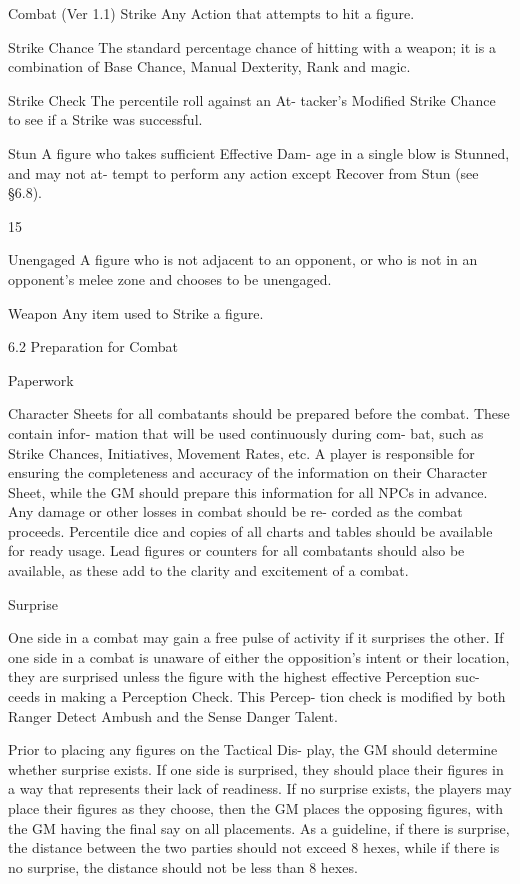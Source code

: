 \begin{Chapter}{Combat (Ver 1.1)}
Strike Any Action that attempts to hit a figure. 

Strike Chance The standard percentage chance of 
hitting with a weapon; it is a combination of Base 
Chance, Manual Dexterity, Rank and magic. 

Strike  Check  The  percentile  roll  against  an  At-
tacker’s  Modified  Strike  Chance  to  see  if  a  Strike 
was successful. 

Stun A figure who takes sufficient Effective Dam-
age  in  a  single  blow  is  Stunned,  and  may  not  at-
tempt  to  perform  any  action  except  Recover  from 
Stun (see §6.8). 

15 

Unengaged  A  figure  who  is  not  adjacent  to  an 
opponent,  or  who  is  not  in  an  opponent’s  melee 
zone and chooses to be unengaged. 

Weapon Any item used to Strike a figure. 

6.2 Preparation for Combat 

Paperwork 

Character  Sheets  for  all  combatants  should  be 
prepared  before  the  combat.  These  contain  infor-
mation that will be used continuously during com-
bat, such as Strike Chances, Initiatives, Movement 
Rates, etc. A player is responsible for ensuring the 
completeness  and  accuracy  of  the  information  on 
their Character Sheet, while the GM should prepare 
this  information  for  all  NPCs  in  advance.  Any 
damage  or  other  losses  in  combat  should  be  re-
corded as the combat proceeds. Percentile dice and 
copies  of  all  charts  and  tables  should  be  available 
for  ready  usage.  Lead  figures  or  counters  for  all 
combatants  should  also  be  available,  as  these  add 
to the clarity and excitement of a combat. 

Surprise 

One  side  in  a  combat  may  gain  a  free  pulse  of 
activity  if  it  surprises  the  other.  If  one  side  in  a 
combat is unaware of either the opposition’s intent 
or  their  location,  they  are  surprised  unless  the 
figure  with  the  highest  effective  Perception  suc-
ceeds in making a Perception Check. This Percep-
tion  check  is  modified  by  both  Ranger  Detect 
Ambush and the Sense Danger Talent. 

Prior  to  placing  any  figures  on  the  Tactical  Dis-
play,  the  GM  should  determine  whether  surprise 
exists.  If  one  side  is  surprised,  they  should  place 
their  figures  in  a  way  that  represents  their  lack  of 
readiness.  If  no  surprise  exists,  the  players  may 
place  their  figures  as  they  choose,  then  the  GM 
places  the  opposing  figures,  with  the  GM  having 
the  final  say  on  all  placements.  As  a  guideline,  if 
there  is  surprise,  the  distance  between  the  two 
parties should not exceed 8 hexes, while if there is 
no  surprise,  the  distance  should  not be  less  than  8 
hexes. 


\end{Chapter}
